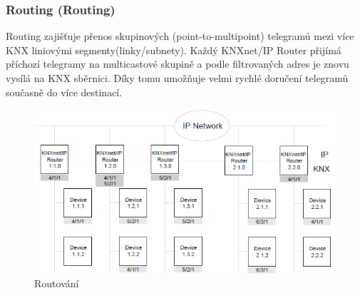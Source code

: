 \subsubsection{Routing (Routing)} 
Routing zajišťuje přenos skupinových (point-to-multipoint) telegramů mezi více KNX liniovými segmenty(linky/subnety). Každý KNXnet/IP Router přijímá příchozí telegramy na multicastové skupině a podle filtrovaných adres je znovu vysílá na KNX sběrnici. Díky tomu umožňuje velmi rychlé doručení telegramů současně do více destinací. \cite{KNXRouting}
\begin{figure}[!h]
  \begin{center}
    \includegraphics[scale=0.7]{obrazky/KNX_Routing.png}
  \end{center}
  \caption[Routování \cite{KNXRouting}]{Routování \cite{KNXRouting}}
  \label{fig:Routovani}
\end{figure}
